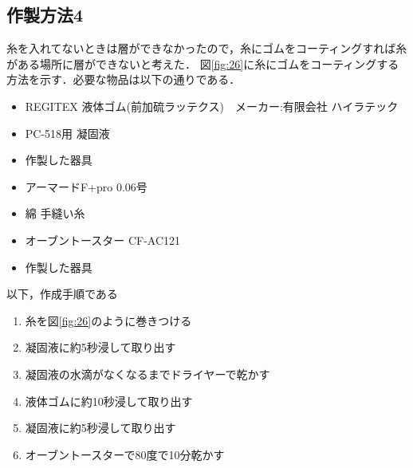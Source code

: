 \subsection{作製方法4}
糸を入れてないときは層ができなかったので，糸にゴムをコーティングすれば糸がある場所に層ができないと考えた．
図\ref{fig:26}に糸にゴムをコーティングする方法を示す．必要な物品は以下の通りである．
\begin{itemize}
  \item REGITEX 液体ゴム(前加硫ラッテクス)　メーカー:有限会社 ハイラテック
  \item PC-518用 凝固液
  \item 作製した器具
  \item アーマードF+pro 0.06号
  \item 綿 手縫い糸
  \item オーブントースター CF-AC121
  \item 作製した器具
\end{itemize}
以下，作成手順である
\begin{enumerate}
  \item 糸を図\ref{fig:26}のように巻きつける
  \item 凝固液に約5秒浸して取り出す
  \item 凝固液の水滴がなくなるまでドライヤーで乾かす
  \item 液体ゴムに約10秒浸して取り出す
  \item 凝固液に約5秒浸して取り出す
  \item オーブントースターで80度で10分乾かす
\end{enumerate}

